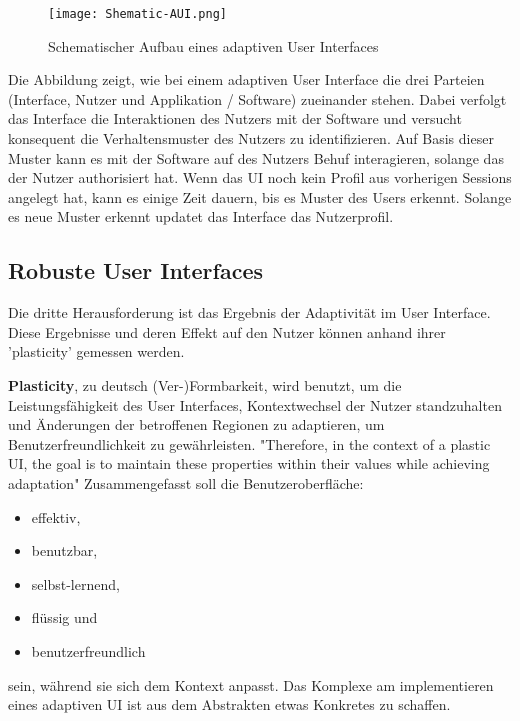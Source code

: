 \begin{figure}[h]
    \centering
    \texttt{[image: Shematic-AUI.png]}
    \caption{Schematischer Aufbau eines adaptiven User Interfaces}
\end{figure}
Die Abbildung zeigt, wie bei einem adaptiven User Interface die drei Parteien (Interface, Nutzer und Applikation / Software) zueinander stehen.
Dabei verfolgt das Interface die Interaktionen des Nutzers mit der Software und versucht konsequent die Verhaltensmuster des Nutzers zu identifizieren. 
Auf Basis dieser Muster kann es mit der Software auf des Nutzers Behuf interagieren, solange das der Nutzer authorisiert hat. Wenn das UI 
noch kein Profil aus vorherigen Sessions angelegt hat, kann es einige Zeit dauern, bis es Muster des Users erkennt. Solange es neue Muster erkennt 
updatet das Interface das Nutzerprofil.

\subsection{Robuste User Interfaces} %
Die dritte Herausforderung ist das Ergebnis der Adaptivität im User Interface. Diese Ergebnisse und deren Effekt auf den Nutzer
können anhand ihrer 'plasticity' gemessen werden.

\textbf{Plasticity}, zu deutsch (Ver-)Formbarkeit, wird benutzt, um die Leistungsfähigkeit des User Interfaces,
Kontextwechsel der Nutzer standzuhalten und Änderungen der betroffenen Regionen zu adaptieren,
um Benutzerfreundlichkeit zu gewährleisten.
"Therefore, in the context of a plastic UI, the goal is to maintain these properties within their values while achieving adaptation"
Zusammengefasst soll die Benutzeroberfläche:
\begin{itemize}
    \item effektiv,
    \item benutzbar,
    \item selbst-lernend,
    \item flüssig und
    \item benutzerfreundlich
\end{itemize}
sein, während sie sich dem Kontext anpasst. Das Komplexe am implementieren eines adaptiven UI ist aus dem Abstrakten
etwas Konkretes zu schaffen.

